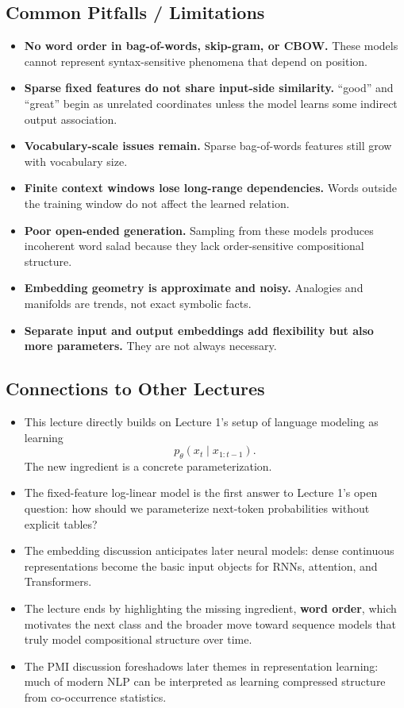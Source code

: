 \documentclass[11pt]{article}
\begin{document}
\subsection{Common Pitfalls / Limitations}
\begin{itemize}
    \item \textbf{No word order in bag-of-words, skip-gram, or CBOW.} These models cannot represent syntax-sensitive phenomena that depend on position.
    \item \textbf{Sparse fixed features do not share input-side similarity.} ``good'' and ``great'' begin as unrelated coordinates unless the model learns some indirect output association.
    \item \textbf{Vocabulary-scale issues remain.} Sparse bag-of-words features still grow with vocabulary size.
    \item \textbf{Finite context windows lose long-range dependencies.} Words outside the training window do not affect the learned relation.
    \item \textbf{Poor open-ended generation.} Sampling from these models produces incoherent word salad because they lack order-sensitive compositional structure.
    \item \textbf{Embedding geometry is approximate and noisy.} Analogies and manifolds are trends, not exact symbolic facts.
    \item \textbf{Separate input and output embeddings add flexibility but also more parameters.} They are not always necessary.
\end{itemize}

\subsection{Connections to Other Lectures}
\begin{itemize}
    \item This lecture directly builds on Lecture 1's setup of language modeling as learning
    \[
    p_\theta(x_t \mid x_{1:t-1}).
    \]
    The new ingredient is a concrete parameterization.
    \item The fixed-feature log-linear model is the first answer to Lecture 1's open question: how should we parameterize next-token probabilities without explicit tables?
    \item The embedding discussion anticipates later neural models: dense continuous representations become the basic input objects for RNNs, attention, and Transformers.
    \item The lecture ends by highlighting the missing ingredient, \textbf{word order}, which motivates the next class and the broader move toward sequence models that truly model compositional structure over time.
    \item The PMI discussion foreshadows later themes in representation learning: much of modern NLP can be interpreted as learning compressed structure from co-occurrence statistics.
\end{itemize}
\end{document}
